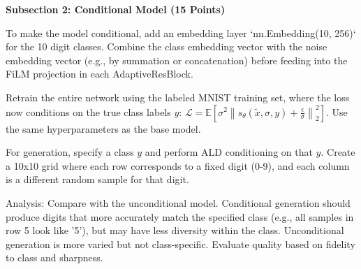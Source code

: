 \documentclass[a4paper,12pt]{article}
\begin{document}
\textbf{Subsection 2: Conditional Model (15 Points)}

To make the model conditional, add an embedding layer `nn.Embedding(10, 256)` for the 10 digit classes. Combine the class embedding vector with the noise embedding vector (e.g., by summation or concatenation) before feeding into the FiLM projection in each AdaptiveResBlock.

Retrain the entire network using the labeled MNIST training set, where the loss now conditions on the true class labels $y$: $\mathcal{L} = \mathbb{E} \left[ \sigma^2 \left\| s_\theta(\tilde{x}, \sigma, y) + \frac{\epsilon}{\sigma} \right\|_2^2 \right]$. Use the same hyperparameters as the base model.

For generation, specify a class $y$ and perform ALD conditioning on that $y$. Create a 10x10 grid where each row corresponds to a fixed digit (0-9), and each column is a different random sample for that digit.

Analysis: Compare with the unconditional model. Conditional generation should produce digits that more accurately match the specified class (e.g., all samples in row 5 look like '5'), but may have less diversity within the class. Unconditional generation is more varied but not class-specific. Evaluate quality based on fidelity to class and sharpness.
\end{document}
